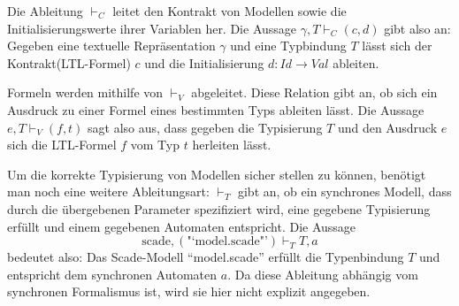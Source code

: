 Die Ableitung $\vdash_C$ leitet den Kontrakt von Modellen sowie die Initialisierungswerte ihrer Variablen her.
Die Aussage $\gamma,T\vdash_C (c,d)$ gibt also an: Gegeben eine textuelle Repräsentation $\gamma$ und eine Typbindung $T$ lässt sich der Kontrakt(LTL-Formel) $c$ und die Initialisierung $d : \mathit{Id}\rightarrow \mathit{Val}$ ableiten.

Formeln werden mithilfe von $\vdash_V$ abgeleitet.
Diese Relation gibt an, ob sich ein Ausdruck zu einer Formel eines bestimmten Typs ableiten lässt.
Die Aussage $e,T\vdash_V (f,t)$ sagt also aus, dass gegeben die Typisierung $T$ und den Ausdruck $e$ sich die LTL-Formel $f$ vom Typ $t$ herleiten lässt.

Um die korrekte Typisierung von Modellen sicher stellen zu können, benötigt man noch eine weitere Ableitungsart:
$\vdash_T$ gibt an, ob ein synchrones Modell, dass durch die übergebenen Parameter spezifiziert wird, eine gegebene Typisierung erfüllt und einem gegebenen Automaten entspricht.
Die Aussage
\[ \textrm{scade},(\textrm{"`model.scade"'})\vdash_T T,a \]
bedeutet also: Das Scade-Modell "`model.scade"' erfüllt die Typenbindung $T$ und entspricht dem synchronen Automaten $a$.
Da diese Ableitung abhängig vom synchronen Formalismus ist, wird sie hier nicht explizit angegeben.

